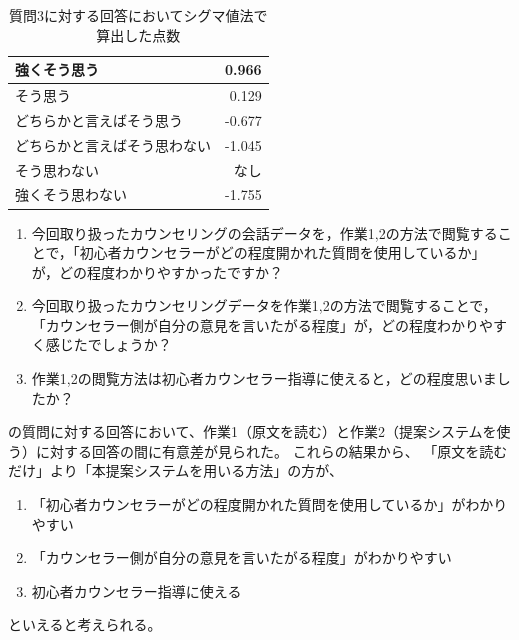 \documentclass[shuuron]{kuee}
\begin{document}
\begin{table}
  \caption{質問3に対する回答においてシグマ値法で算出した点数}
  \label{table:sigma2}
  \begin{center}
    \begin{tabular}{|l|r|} \hline
      強くそう思う & 0.966 \\ \hline
      そう思う  & 0.129 \\ \hline
      どちらかと言えばそう思う & -0.677 \\ \hline
      どちらかと言えばそう思わない & -1.045 \\ \hline
      そう思わない  & なし \\ \hline
      強くそう思わない & -1.755 \\ \hline
    \end{tabular}
  \end{center}
\end{table}


\begin{enumerate}

  \item 今回取り扱ったカウンセリングの会話データを，作業1,2の方法で閲覧することで，「初心者カウンセラーがどの程度開かれた質問を使用しているか」が，どの程度わかりやすかったですか？
  \item 今回取り扱ったカウンセリングデータを作業1,2の方法で閲覧することで，「カウンセラー側が自分の意見を言いたがる程度」が，どの程度わかりやすく感じたでしょうか？
  \item 作業1,2の閲覧方法は初心者カウンセラー指導に使えると，どの程度思いましたか？
\end{enumerate}

の質問に対する回答において、作業1（原文を読む）と作業2（提案システムを使う）に対する回答の間に有意差が見られた。
これらの結果から、
「原文を読むだけ」より「本提案システムを用いる方法」の方が、
\begin{enumerate}

  \item 「初心者カウンセラーがどの程度開かれた質問を使用しているか」がわかりやすい
  \item 「カウンセラー側が自分の意見を言いたがる程度」がわかりやすい
  \item 初心者カウンセラー指導に使える
\end{enumerate}
といえると考えられる。
\end{document}
